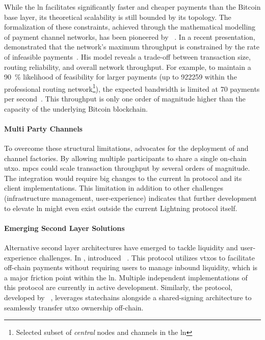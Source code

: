 While the \gls{ln} facilitates significantly faster and cheaper payments than the 
Bitcoin base layer, its theoretical scalability is still bounded by its topology. 
The formalization of these constraints, achieved through the mathematical modelling of payment channel networks, 
has been pioneered by \citeauthor{pickhardt_mathematical_2026}~\cite{pickhardt_mathematical_2026}.
In a recent presentation, \citeauthor{pickhardt_mathematical_2026} demonstrated 
that the network's maximum throughput is constrained by the rate of infeasible payments~\cite{pickhardt_everything_2025}. 
His model reveals a trade-off between transaction size, 
routing reliability, and overall network throughput. 
For example, to maintain a \qty{90}{\percent} likelihood of feasibility for larger payments 
(up to \qty{922259}{\sat} within the professional routing network\footnote{Selected subset of \textit{central} nodes and channels in the \gls{ln}}), 
the expected bandwidth is limited at \num{70} payments per second~\cite{pickhardt_everything_2025}. 
This throughput is only one order of magnitude higher than the capacity of the underlying Bitcoin blockchain.


\paragraph{Multi Party Channels}

To overcome these structural limitations, \citeauthor{pickhardt_mathematical_2026} 
advocates for the deployment of  and channel factories. 
By allowing multiple participants to share a single on-chain \gls{utxo}.
\glspl{mpc} could scale transaction throughput by several orders of magnitude. 
The integration would require big changes to the current \gls{ln} protocol and its client implementations.
This limitation in addition to other challenges (infrastructure management, user-experience) indicates that 
further development to elevate \gls{ln} might even exist outside the current Lightning protocol itself. 


\paragraph{Emerging Second Layer Solutions}

Alternative second layer architectures have emerged to tackle liquidity and user-experience challenges.
In \citeyear{keceli_bitcoindev_2023}, \citeauthor{keceli_bitcoindev_2023} introduced ~\cite{keceli_bitcoindev_2023}. 
This protocol utilizes \glspl{vtxo} to facilitate off-chain payments without requiring users to manage inbound liquidity,
which is a major friction point within the \gls{ln}. 
Multiple independent implementations of this protocol are currently in active development. 
Similarly, the  protocol, developed by \citeauthor{lightspark_buildonspark_2026}~\cite{lightspark_buildonspark_2026}, 
leverages statechains alongside a shared-signing architecture to seamlessly transfer \gls{utxo} ownership off-chain.


